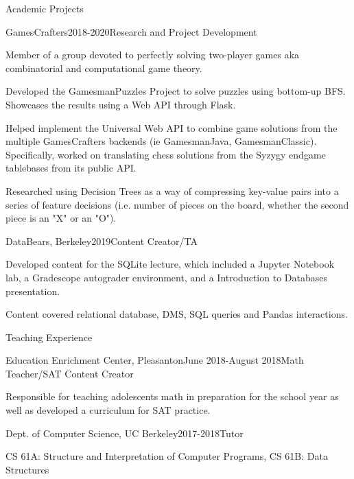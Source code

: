 \documentclass{resume} %
\begin{document}
\newpage

\begin{rSection}{Academic Projects}

\begin{rSubsection}{GamesCrafters}{2018-2020}{Research and Project Development}{}
    \item Member of a group devoted to perfectly solving two-player games aka combinatorial and computational game theory.
    \item Developed the GamesmanPuzzles Project to solve puzzles using bottom-up BFS. Showcases the results using a Web API through Flask.
    \item Helped implement the Universal Web API to combine game solutions from the multiple GamesCrafters backends (ie GamesmanJava, GamesmanClassic). 
    Specifically, worked on translating chess solutions from the Syzygy endgame tablebases from its public API.
    \item Researched using Decision Trees as a way of compressing key-value pairs into a series of feature decisions (i.e. number of pieces on the board, whether the second piece is an "X" or an "O").
\end{rSubsection}

\begin{rSubsection}{DataBears, Berkeley}{2019}{Content Creator/TA}{}
    \item Developed content for the SQLite lecture, which included a Jupyter Notebook lab, a Gradescope autograder environment, and a Introduction to Databases presentation.
    \item Content covered relational database, DMS, SQL queries and Pandas interactions.
\end{rSubsection}    

\end{rSection}


\begin{rSection}{Teaching Experience} 
\begin{rSubsection}{Education Enrichment Center, Pleasanton}{June 2018-August 2018}{Math Teacher/SAT Content Creator}{}
\item Responsible for teaching adolescents math in preparation for the school year as well as developed a curriculum for SAT practice.
\end{rSubsection}

\begin{rSubsection}{Dept. of Computer Science, UC Berkeley}{2017-2018}{Tutor}{}
\item CS 61A: Structure and Interpretation of Computer Programs, CS 61B: Data Structures
\end{rSubsection}
\end{rSection}
\end{document}
